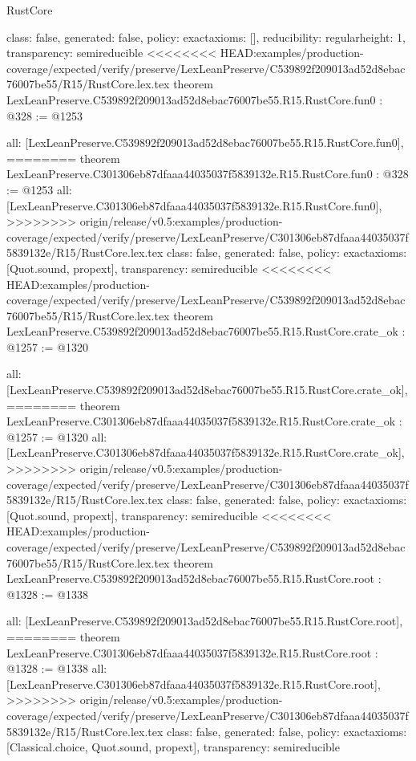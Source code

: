 \begin{lexlean}{RustCore}
\begin{coremodule}
{\begin{coremodule}
{{{  class: false,
  generated: false,
  policy: exact{axioms: []},
  reducibility: regular{height: 1},
  transparency: semireducible
}
<<<<<<<< HEAD:examples/production-coverage/expected/verify/preserve/LexLeanPreserve/C539892f209013ad52d8ebac76007be55/R15/RustCore.lex.tex
theorem LexLeanPreserve.C539892f209013ad52d8ebac76007be55.R15.RustCore.fun0 : @328 := @1253 {
  all: [LexLeanPreserve.C539892f209013ad52d8ebac76007be55.R15.RustCore.fun0],
========
theorem LexLeanPreserve.C301306eb87dfaaa44035037f5839132e.R15.RustCore.fun0 : @328 := @1253 {
  all: [LexLeanPreserve.C301306eb87dfaaa44035037f5839132e.R15.RustCore.fun0],
>>>>>>>> origin/release/v0.5:examples/production-coverage/expected/verify/preserve/LexLeanPreserve/C301306eb87dfaaa44035037f5839132e/R15/RustCore.lex.tex
  class: false,
  generated: false,
  policy: exact{axioms: [Quot.sound, propext]},
  transparency: semireducible
}
<<<<<<<< HEAD:examples/production-coverage/expected/verify/preserve/LexLeanPreserve/C539892f209013ad52d8ebac76007be55/R15/RustCore.lex.tex
theorem LexLeanPreserve.C539892f209013ad52d8ebac76007be55.R15.RustCore.crate_ok : @1257 := @1320 {
  all: [LexLeanPreserve.C539892f209013ad52d8ebac76007be55.R15.RustCore.crate_ok],
========
theorem LexLeanPreserve.C301306eb87dfaaa44035037f5839132e.R15.RustCore.crate_ok : @1257 := @1320 {
  all: [LexLeanPreserve.C301306eb87dfaaa44035037f5839132e.R15.RustCore.crate_ok],
>>>>>>>> origin/release/v0.5:examples/production-coverage/expected/verify/preserve/LexLeanPreserve/C301306eb87dfaaa44035037f5839132e/R15/RustCore.lex.tex
  class: false,
  generated: false,
  policy: exact{axioms: [Quot.sound, propext]},
  transparency: semireducible
}
<<<<<<<< HEAD:examples/production-coverage/expected/verify/preserve/LexLeanPreserve/C539892f209013ad52d8ebac76007be55/R15/RustCore.lex.tex
theorem LexLeanPreserve.C539892f209013ad52d8ebac76007be55.R15.RustCore.root : @1328 := @1338 {
  all: [LexLeanPreserve.C539892f209013ad52d8ebac76007be55.R15.RustCore.root],
========
theorem LexLeanPreserve.C301306eb87dfaaa44035037f5839132e.R15.RustCore.root : @1328 := @1338 {
  all: [LexLeanPreserve.C301306eb87dfaaa44035037f5839132e.R15.RustCore.root],
>>>>>>>> origin/release/v0.5:examples/production-coverage/expected/verify/preserve/LexLeanPreserve/C301306eb87dfaaa44035037f5839132e/R15/RustCore.lex.tex
  class: false,
  generated: false,
  policy: exact{axioms: [Classical.choice, Quot.sound, propext]},
  transparency: semireducible
}

}}}}}
\end{coremodule}}
\end{coremodule}
\end{lexlean}
